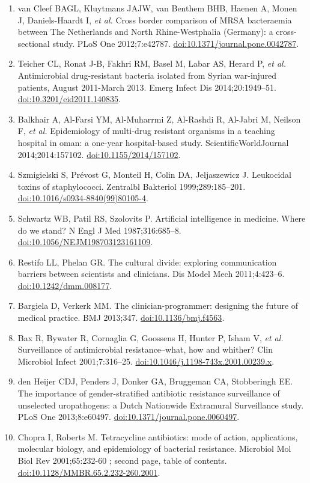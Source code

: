 \documentclass[
]{book}
\begin{document}
\begin{enumerate}
\item
  van Cleef BAGL, Kluytmans JAJW, van Benthem BHB, Haenen A, Monen J, Daniels-Haardt I, \emph{et al.} Cross border comparison of MRSA bacteraemia between The Netherlands and North Rhine-Westphalia (Germany): a cross-sectional study. PLoS One 2012;7:e42787. \url{doi:10.1371/journal.pone.0042787}.
\item
  Teicher CL, Ronat J-B, Fakhri RM, Basel M, Labar AS, Herard P, \emph{et al.} Antimicrobial drug-resistant bacteria isolated from Syrian war-injured patients, August 2011-March 2013. Emerg Infect Dis 2014;20:1949--51. \url{doi:10.3201/eid2011.140835}.
\item
  Balkhair A, Al-Farsi YM, Al-Muharrmi Z, Al-Rashdi R, Al-Jabri M, Neilson F, \emph{et al.} Epidemiology of multi-drug resistant organisms in a teaching hospital in oman: a one-year hospital-based study. ScientificWorldJournal 2014;2014:157102. \url{doi:10.1155/2014/157102}.
\item
  Szmigielski S, Prévost G, Monteil H, Colin DA, Jeljaszewicz J. Leukocidal toxins of staphylococci. Zentralbl Bakteriol 1999;289:185--201. \url{doi:10.1016/s0934-8840(99)80105-4}.
\item
  Schwartz WB, Patil RS, Szolovits P. Artificial intelligence in medicine. Where do we stand? N Engl J Med 1987;316:685--8. \url{doi:10.1056/NEJM198703123161109}.
\item
  Restifo LL, Phelan GR. The cultural divide: exploring communication barriers between scientists and clinicians. Dis Model Mech 2011;4:423--6. \url{doi:10.1242/dmm.008177}.
\item
  Bargiela D, Verkerk MM. The clinician-programmer: designing the future of medical practice. BMJ 2013;347. \url{doi:10.1136/bmj.f4563}.
\item
  Bax R, Bywater R, Cornaglia G, Goossens H, Hunter P, Isham V, \emph{et al.} Surveillance of antimicrobial resistance--what, how and whither? Clin Microbiol Infect 2001;7:316--25. \url{doi:10.1046/j.1198-743x.2001.00239.x}.
\item
  den Heijer CDJ, Penders J, Donker GA, Bruggeman CA, Stobberingh EE. The importance of gender-stratified antibiotic resistance surveillance of unselected uropathogens: a Dutch Nationwide Extramural Surveillance study. PLoS One 2013;8:e60497. \url{doi:10.1371/journal.pone.0060497}.
\item
  Chopra I, Roberts M. Tetracycline antibiotics: mode of action, applications, molecular biology, and epidemiology of bacterial resistance. Microbiol Mol Biol Rev 2001;65:232-60 ; second page, table of contents. \url{doi:10.1128/MMBR.65.2.232-260.2001}.

\end{enumerate}
\end{document}

